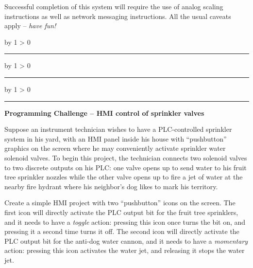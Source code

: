 \documentclass[12pt,a4paper]{article}
\def\oppgave{
            \advance\questnum by 1
            \ifnum \questnum > 0
                 \hrule
                 \vskip 3pt
                 \leftline{Oppgave \the\questnum}
                 \vskip 3pt \fi}
\def\svar{
           \advance\answnum by 1
           \ifnum \answnum > 0
                \hrule
                \vskip 3pt
                \leftline{Svar \the\answnum}
                \vskip 3pt \fi}
\def\notes{
           \advance\explnum by 1
           \ifnum \explnum > 0
                \hrule
                \vskip 3pt
                \leftline{Notes \the\explnum}
                \vskip 3pt \fi}
\begin{document}
\vskip 10pt

Successful completion of this system will require the use of analog scaling instructions as well as network messaging instructions.  All the usual caveats apply -- {\it have fun!}

\vfil 

\eject
\vskip 10pt \filbreak 





\svar{} 

 
\vskip 10pt \filbreak 





\notes{} 



\vfil \eject 



\oppgave{} 

\noindent
{\bf Programming Challenge -- HMI control of sprinkler valves} 

\vskip 10pt

Suppose an instrument technician wishes to have a PLC-controlled sprinkler system in his yard, with an HMI panel inside his house with ``pushbutton'' graphics on the screen where he may conveniently activate sprinkler water solenoid valves.  To begin this project, the technician connects two solenoid valves to two discrete outputs on his PLC: one valve opens up to send water to his fruit tree sprinkler nozzles while the other valve opens up to fire a jet of water at the nearby fire hydrant where his neighbor's dog likes to mark his territory.

\vskip 10pt

Create a simple HMI project with two ``pushbutton'' icons on the screen.  The first icon will directly activate the PLC output bit for the fruit tree sprinklers, and it needs to have a {\it toggle} action: pressing this icon once turns the bit on, and pressing it a second time turns it off.  The second icon will directly activate the PLC output bit for the anti-dog water cannon, and it needs to have a {\it momentary} action: pressing this icon activates the water jet, and releasing it stops the water jet.
\end{document}
